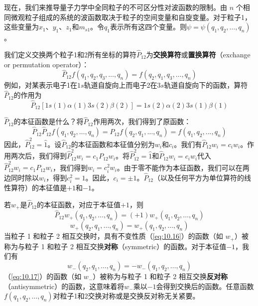     现在，我们来推导量子力学中全同粒子的不可区分性对波函数的限制。由 $n$ 个相同微观粒子组成的系统的波函数取决于粒子的空间变量和自旋变量。对于粒子1，这些变量为$x_1$、$y_1$、$z_1$和$m_{s1}$。令$q_1$表示所有这四个变量。则$\psi = \psi\left(q_1, q_2, \ldots, q_n\right)$。

    我们定义交换两个粒子1和2所有坐标的算符$\hat{P}_{12}$为\textbf{交换算符}或\textbf{置换算符}（exchange or permutation operator）：
    \begin{equation}
        \boxed{
            \hat{P}_{12} f\left(q_1, q_2, q_3, \ldots, q_n\right) = f\left(q_2, q_1, q_3, \ldots, q_n\right)
        }
        \label{eq:10.14}
    \end{equation}
    例如，对某表示电子1在$1s$轨道自旋向上而电子2在$3s$轨道自旋向下的函数，算符$\hat{P}_{12}$的作用为
    \begin{equation}
        \hat{P}_{12}\left[1s\left(1\right)\alpha\left(1\right)3s\left(2\right)\beta\left(2\right)\right] = 1s\left(2\right)\alpha\left(2\right)3s\left(1\right)\beta\left(1\right)
        \label{eq:10.15}
    \end{equation}

    $\hat{P}_{12}$的本征函数是什么？将$\hat{P}_{12}$作用两次，我们得到了原函数：
    \begin{equation*}
        \hat{P}_{12} \hat{P}_{12} f\left(q_1, q_2, \ldots, q_n\right) = \hat{P}_{12} f\left(q_2, q_1, \ldots, q_n\right) = f\left(q_1, q_2, ..., q_n\right)
    \end{equation*}
    因此，$\hat{P}_{12}^2 = \hat{1}$。设$\hat{P}_{12}$的本征函数和本征值分别为$w_i$和$c_i$。我们有$\hat{P}_{12} w_i = c_i w_i$。作用两次后，我们得到$\hat{P}_{12}^2 w_i = c_1 P_{12} w_i$。将$\hat{P}_{12}^2 = \hat{1}$和$\hat{P}_{12} w_i = c_i w_i$代入$\hat{P}_{12}^2 w_i = c_1 P_{12} w_i$，我们得到$w_i = c_i^2 w_i$。由于零不能作为本征函数，我们可以在两边同时除以$w_i$，得到$c_i^2 = 1$。因此，$c_i = \pm 1$。$\hat{P}_{12}$（以及任何平方为单位算符的线性算符）的本征值是$+1$和$-1$。

    若$w_+$是$\hat{P}_{12}$的本征函数，对应于本征值$+1$，则
    \begin{equation*}
        \hat{P}_{12}w_{+}\left(q_1, q_2, \ldots, q_n\right) = \left(+1\right)w_{+}\left(q_1, q_2, \ldots, q_n\right)
    \end{equation*}
    \begin{equation}
        \boxed{
            w_{+}\left(q_{2}, q_{1}, \ldots, q_{n}\right) = w_{+}\left(q_{1}, q_{2}, \ldots, q_{n}\right)
        }
        \label{eq:10.16}
    \end{equation}
    当粒子 1 和粒子 2 相互交换时，具有不变性质（\ref{eq:10.16}）的函数（如 $w_+$）被称为与粒子 1 和粒子 2 相互交换\textbf{对称}（symmetric）的函数。对于本征值$-1$，我们有
    \begin{equation}
        \boxed{
            w_{-}\left(q_{2}, q_{1}, \ldots, q_{n}\right) = -w_{-}\left(q_{1}, q_{2}, \ldots, q_{n}\right)
        }
        \label{eq:10.17}
    \end{equation}
    （\ref{eq:10.17}）的函数（如 $w_-$）被称为与粒子 1 和粒子 2 相互交换\textbf{反对称}（antisymmetric）的函数，这意味着将$w_-$乘以$-1$会得到交换后的函数。任意函数$f\left(q_1, q_2, \ldots, q_n\right)$对粒子1和2交换对称或是交换反对称无关紧要。

